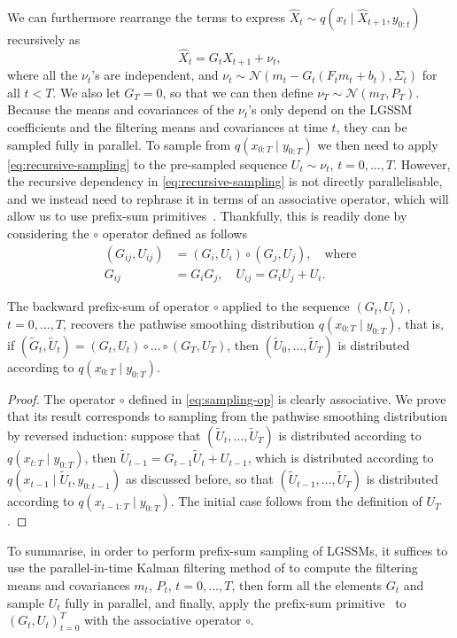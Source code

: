 We can furthermore rearrange the terms to express $\hat{X}_t \sim q(x_t \mid \hat{X}_{t+1}, y_{0:t})$ recursively as
\begin{equation}
    \label{eq:recursive-sampling}
    \hat{X}_t = G_{t} \hat{X}_{t+1} + \nu_t,
\end{equation}
where all the $\nu_t$'s are independent, and $\nu_t \sim \mathcal{N}(m_t - G_t (F_t m_t + b_t), \Sigma_t)$ for all $t < T$. We also let $G_T = 0$, so that we can then define $\nu_T \sim \mathcal{N}(m_T, P_T)$. Because the means and covariances of the $\nu_t$'s only depend on the LGSSM coefficients and the filtering means and covariances at time $t$, they can be sampled fully in parallel. To sample from $q(x_{0:T} \mid y_{0:T})$ we then need to apply \eqref{eq:recursive-sampling} to the pre-sampled sequence $U_t \sim \nu_t$, $t=0, \ldots, T$. However, the recursive dependency in \eqref{eq:recursive-sampling} is not directly parallelisable, and we instead need to rephrase it in terms of an associative operator, which will allow us to use prefix-sum primitives~\citep{blelloch1989scans}. Thankfully, this is readily done by considering the $\circ$ operator defined as follows
\begin{equation}
    \label{eq:sampling-op}
    \begin{split}
    (G_{ij}, U_{ij})
        &= (G_i, U_i) \circ (G_j, U_j), \quad \text{where} \\
        G_{ij} &= G_i G_j, \quad U_{ij} = G_i U_j + U_i.
    \end{split}
\end{equation}
\begin{proposition}
    \label{prop:prefix-sum-sampling}
    The backward prefix-sum of operator $\circ$ applied to the sequence $(G_t, U_t)$, $t=0, \ldots, T$, recovers the pathwise smoothing distribution $q(x_{0:T} \mid y_{0:T})$, that is, if $(\tilde{G}_t, \tilde{U}_t) = (G_t, U_t) \circ \ldots \circ (G_T, U_T)$, then $(\tilde{U}_0, \ldots, \tilde{U}_T)$ is distributed according to $q(x_{0:T} \mid y_{0:T})$.
\end{proposition}
\begin{proof}
    The operator $\circ$ defined in \eqref{eq:sampling-op} is clearly associative. We prove that its result corresponds to sampling from the pathwise smoothing distribution by reversed induction: suppose that $(\tilde{U}_t, \ldots, \tilde{U}_T)$ is distributed according to $q(x_{t:T} \mid y_{0:T})$, then $\tilde{U}_{t-1} = G_{t-1} \tilde{U}_t + U_{t-1}$, which is distributed according to $q(x_{t-1} \mid \tilde{U}_{t}, y_{0:t-1})$ as discussed before, so that $(\tilde{U}_{t-1}, \ldots, \tilde{U}_T)$ is distributed according to $q(x_{t-1:T} \mid y_{0:T})$. The initial case follows from the definition of $U_T$.
\end{proof}

To summarise, in order to perform prefix-sum sampling of LGSSMs, it suffices to use the parallel-in-time Kalman filtering method of \citet{Sarkka2021temporal} to compute the filtering means and covariances $m_t$, $P_t$, $t=0, \ldots, T$, then form all the elements $G_t$ and sample $U_t$ fully in parallel, and finally, apply the prefix-sum primitive~\citep{blelloch1989scans} to $(G_t, U_t)_{t=0}^T$ with the associative operator $\circ$.